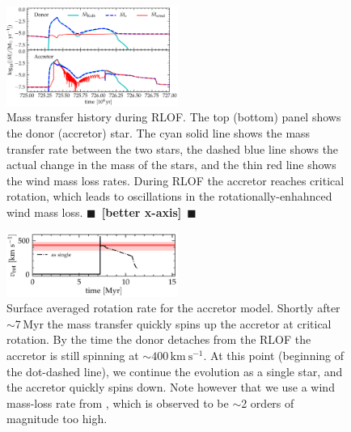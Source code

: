 \documentclass[twocolumn,twocolappendix,trackchanges]{aastex63}
\newcommand{\kms}{{\mathrm{km\ s^{-1}}}}
\newcommand{\todo}[1]{{\large $\blacksquare$~\textbf{\color{red}[#1]}}~$\blacksquare$}
\begin{document}
\begin{figure}[htbp]
  \includegraphics[width=0.5\textwidth]{MT}
  \caption{Mass transfer history during RLOF. The top (bottom) panel
    shows the donor (accretor) star. The cyan solid line shows the
    mass transfer rate between the two stars, the dashed blue line
    shows the actual change in the mass of the stars, and the thin red
    line shows the wind mass loss rates. During RLOF the accretor
    reaches critical rotation, which leads to oscillations in the
    rotationally-enhahnced wind mass loss. \todo{better x-axis}}
  \label{fig:MT}
\end{figure}

\begin{figure}[htbp]
  \includegraphics[width=0.5\textwidth]{zeta_rot}
  \caption{Surface averaged rotation rate for the accretor
    model. Shortly after $\sim$7\,Myr the mass transfer quickly spins
    up the accretor at critical rotation. By the time the donor
    detaches from the RLOF the accretor is still spinning at
    $\sim$$400\,\kms$. At this point (beginning of the dot-dashed line), we continue the evolution as a single star, and the accretor quickly spins down. Note however that we use a wind mass-loss rate from \cite{vink:01}, which is observed to be
    $\sim$2 orders of magnitude too high.}
  \label{fig:rot}
\end{figure}
\end{document}
